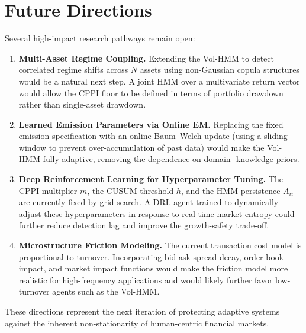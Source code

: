 \section{Future Directions}

Several high-impact research pathways remain open:

\begin{enumerate}
    \item \textbf{Multi-Asset Regime Coupling.}
    Extending the Vol-HMM to detect correlated regime shifts across $N$
    assets using non-Gaussian copula structures would be a natural next step.
    A joint HMM over a multivariate return vector would allow the CPPI floor
    to be defined in terms of portfolio drawdown rather than single-asset
    drawdown.

    \item \textbf{Learned Emission Parameters via Online EM.}
    Replacing the fixed emission specification with an online Baum--Welch
    update (using a sliding window to prevent over-accumulation of past data)
    would make the Vol-HMM fully adaptive, removing the dependence on domain-
    knowledge priors.

    \item \textbf{Deep Reinforcement Learning for Hyperparameter Tuning.}
    The CPPI multiplier $m$, the CUSUM threshold $h$, and the HMM persistence
    $A_{ii}$ are currently fixed by grid search.  A DRL agent trained to
    dynamically adjust these hyperparameters in response to real-time market
    entropy could further reduce detection lag and improve the growth-safety
    trade-off.

    \item \textbf{Microstructure Friction Modeling.}
    The current transaction cost model is proportional to turnover.
    Incorporating bid-ask spread decay, order book impact, and market impact
    functions would make the friction model more realistic for high-frequency
    applications and would likely further favor low-turnover agents such as
    the Vol-HMM.
\end{enumerate}

These directions represent the next iteration of protecting adaptive systems
against the inherent non-stationarity of human-centric financial markets.
